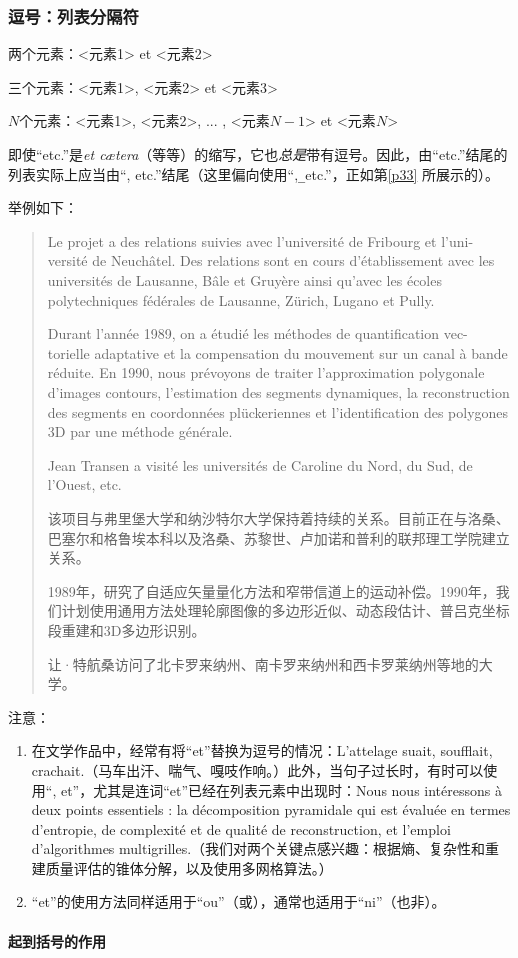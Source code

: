 \begin{mdframed}
    \subsubsection*{逗号：列表分隔符}

    \noindent 两个元素：<元素1> et <元素2>

    \noindent 三个元素：<元素1>, <元素2> et <元素3>

    \noindent $N$个元素：<元素1>, <元素2>, ... , <元素$N-1$> et <元素$N$>
\end{mdframed}

即使“etc.”是\emph{et cætera}（等等）的缩写，它也\emph{总是}带有逗号。因此，由“etc.”结尾的列表实际上应当由“, etc.”结尾（这里偏向使用“,\verb|_|etc.”，正如第\ref{p33}%
所展示的）。

举例如下：

\begin{quote}
    Le projet a des relations suivies avec l’université de Fribourg et l’uni- versité de Neuchâtel. Des relations sont en cours d’établissement avec les universités de Lausanne, Bâle et Gruyère ainsi qu’avec les écoles polytechniques fédérales de Lausanne, Zürich, Lugano et Pully.

    Durant l’année 1989, on a étudié les méthodes de quantification vec- torielle adaptative et la compensation du mouvement sur un canal à bande réduite. En 1990, nous prévoyons de traiter l’approximation polygonale d’images contours, l’estimation des segments dynamiques, la reconstruction des segments en coordonnées plückeriennes et l’identification des polygones 3D par une méthode générale.

    Jean Transen a visité les universités de Caroline du Nord, du Sud, de l’Ouest, etc.

    \begin{bil}
        该项目与弗里堡大学和纳沙特尔大学保持着持续的关系。目前正在与洛桑、巴塞尔和格鲁埃本科以及洛桑、苏黎世、卢加诺和普利的联邦理工学院建立关系。

        1989年，研究了自适应矢量量化方法和窄带信道上的运动补偿。1990年，我们计划使用通用方法处理轮廓图像的多边形近似、动态段估计、普吕克坐标段重建和3D多边形识别。

        让·特航桑访问了北卡罗来纳州、南卡罗来纳州和西卡罗莱纳州等地的大学。
    \end{bil}
\end{quote}

注意：

\begin{enumerate}
    \item 在文学作品中，经常有将“et”替换为逗号的情况：L’attelage suait, soufflait, crachait.（马车出汗、喘气、嘎吱作响。）此外，当句子过长时，有时可以使用“, et”，尤其是连词“et”已经在列表元素中出现时：Nous nous intéressons à deux points essentiels : la décomposition pyramidale qui est évaluée en termes d’entropie, de complexité et de qualité de reconstruction, et l’emploi d’algorithmes multigrilles.（我们对两个关键点感兴趣：根据熵、复杂性和重建质量评估的锥体分解，以及使用多网格算法。）
    \item “et”的使用方法同样适用于“ou”（或），通常也适用于“ni”（也非）。
\end{enumerate}

\paragraph{起到括号的作用}